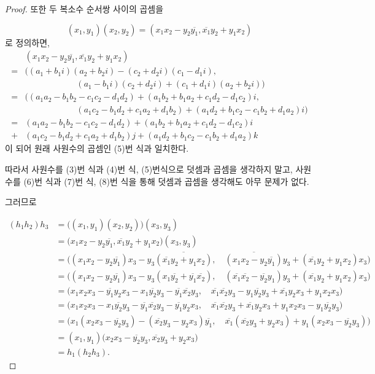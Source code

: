 \documentclass{article}
\newcommand{\ov}[1]{\ensuremath{\overline{#1}}}
\begin{document}
\begin{proof}
또한 두 복소수 순서쌍 사이의 곱셈을

\begin{equation}
(x_1,y_1)(x_2,y_2)=(x_1x_2-y_2\overline{y_1},\overline{x_1}y_2+y_1x_2)
\end{equation}
로 정의하면,
\begin{align*}
&(x_1x_2-y_2\overline{y_1},\overline{x_1}y_2+y_1x_2)\\
=&\Big((a_1+b_1i)(a_2+b_2i)-(c_2+d_2i)(c_1-d_1i),\\
&\qquad\qquad\qquad(a_1-b_1i)(c_2+d_2i)+(c_1+d_1i)(a_2+b_2i)\Big)\\
=&\Big((a_1a_2-b_1b_2-c_1c_2-d_1d_2)+(a_1b_2+b_1a_2+c_1d_2-d_1c_2)i,\\
&\qquad\qquad\qquad(a_1c_2-b_1d_2+c_1a_2+d_1b_2)+(a_1d_2+b_1c_2-c_1b_2+d_1a_2)i\Big)\\
=&(a_1a_2-b_1b_2-c_1c_2-d_1d_2)+(a_1b_2+b_1a_2+c_1d_2-d_1c_2)i\\
+&(a_1c_2-b_1d_2+c_1a_2+d_1b_2)j+(a_1d_2+b_1c_2-c_1b_2+d_1a_2)k
\end{align*}
이 되어 원래 사원수의 곱셈인 (5)번 식과 일치한다.

따라서 사원수를 (3)번 식과 (4)번 식, (5)번식으로 덧셈과 곱셈을 생각하지 말고, 사원수를 (6)번 식과 (7)번 식, (8)번 식을 통해 덧셈과 곱셈을 생각해도 아무 문제가 없다.

그러므로

\begin{align*}
(h_1h_2)h_3
&=\Big((x_1,y_1)(x_2,y_2)\Big)(x_3,y_3)\\
&=\Big(x_1x_2-y_2\ov{y_1},\ov{x_1}y_2+y_1x_2\Big)(x_3,y_3)\\
&=\Big((x_1x_2-y_2\ov{y_1})x_3-y_3\ov{(\ov{x_1}y_2+y_1x_2)},\quad
\ov{(x_1x_2-y_2\ov{y_1})}y_3+(\ov{x_1}y_2+y_1x_2)x_3\Big)\\
&=\Big((x_1x_2-y_2\ov{y_1})x_3-y_3(x_1\ov{y_2}+\ov{y_1}\ov{x_2}),\quad
(\ov{x_1}\ov{x_2}-\ov{y_2}y_1)y_3+(\ov{x_1}y_2+y_1x_2)x_3\Big)\\
&=\Big(x_1x_2x_3-\ov{y_1}y_2x_3-x_1\ov{y_2}y_3-\ov{y_1}\ov{x_2}y_3,\quad
\ov{x_1}\ov{x_2}y_3-y_1\ov{y_2}y_3+\ov{x_1}y_2x_3+y_1x_2x_3\Big)\\
&=\Big(x_1x_2x_3-x_1\ov{y_2}y_3-\ov{y_1}\ov{x_2}y_3-\ov{y_1}y_2x_3,\quad
\ov{x_1}\ov{x_2}y_3+\ov{x_1}y_2x_3+y_1x_2x_3-y_1\ov{y_2}y_3\Big)\\
&=\Big(x_1(x_2x_3-\ov{y_2}y_3)-(\ov{x_2}y_3-y_2x_3)\ov{y_1},\quad
\ov{x_1}(\ov{x_2}y_3+y_2x_3)+y_1(x_2x_3-\ov{y_2}y_3)\Big)\\
&=(x_1,y_1)\Big(x_2x_3-\ov{y_2}y_3,\ov{x_2}y_3+y_2x_3\Big)\\
&=h_1(h_2h_3).
\end{align*}


\end{proof}
\end{document}
